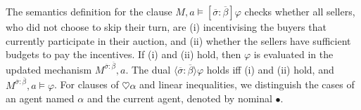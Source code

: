 \documentclass[letterpaper]{article} %
\theoremstyle{definition}
\begin{document}
The semantics definition for the clause $M, a \models [\overline{\sigma}:\overline{\beta}] \varphi$ checks whether all sellers, who did not choose to skip their turn, are (i) incentivising the buyers that currently participate in their auction, and (ii) whether the sellers have sufficient budgets to pay the incentives. If (i) and (ii) hold, then $\varphi$ is evaluated in the updated mechanism  $M^{\overline{\sigma}:\overline{\beta}},a$. %
The dual $\langle \overline{\sigma}:\overline{\beta} \rangle \varphi$ holds iff (i) and (ii) hold, and $M^{\overline{\sigma}:\overline{\beta}},a \models \varphi$.
For clauses of $\heartsuit \alpha$ and linear inequalities, we distinguish the cases of an agent named $\alpha$ and the current agent, denoted by nominal $\bullet$. %

\end{document}
